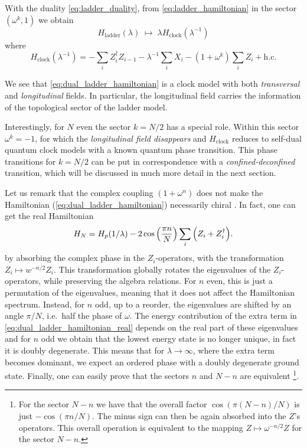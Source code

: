 With the duality \eqref{eq:ladder_duality}, from \eqref{eq:ladder_hamiltonian} in the sector $(\omega^k, 1)$ we obtain
\begin{equation}
    H_{\text{ladder}}(\lambda) \; \longmapsto \; \lambda H_{\text{clock}}(\lambda^{-1})
\end{equation}
where
\begin{equation}
    H_{\text{clock}}(\lambda^{-1}) =
    - \sum_{i} Z_i^\dagger Z_{i-1}
    - \lambda^{-1} \sum_{i} X_i
    - (1 + \omega^k) \sum_{i} Z_i
    + \text{h.c.}
    \label{eq:dual_ladder_hamiltonian}
\end{equation}

We see that \eqref{eq:dual_ladder_hamiltonian} is a clock model with both \emph{transversal} and \emph{longitudinal} fields.
In particular, the longitudinal field carries the information of the topological sector of the ladder model.

Interestingly, for $N$ even the sector $k = N/2$ has a special role.
Within this sector $\omega^k = -1$, for which the \emph{longitudinal field disappears} and $H_{\text{clock}}$ reduces to self-dual quantum clock models with a known quantum phase transition.
This phase transitions for $k = N/2$ can be put in correspondence with a \emph{confined-deconfined} transition, which will be discussed in much more detail in the next section.

Let us remark that the complex coupling $(1 + \omega^n)$ does not make the Hamiltonian  (\ref{eq:dual_ladder_hamiltonian}) necessarily chiral \cite{fendley2012parafermions, whitsitt2018clock}.
In fact, one can get the real Hamiltonian
\begin{equation}
    H_N = H_p(1/\lambda) - 2 \cos \pqty{\frac{\pi n}{N}} \sum_{i} \pqty{Z_i + Z_i^{\dagger}}.
    \label{eq:dual_ladder_hamiltonian_real}
\end{equation}
by absorbing the complex phase in the $Z_i$-operators, with the transformation $Z_i \mapsto w^{-n/2} Z_i$. This transformation globally rotates the eigenvalues of the $Z_i$-operators, while preserving the algebra relations.
For $n$ even, this is just a permutation of the eigenvalues, meaning that it does not affect the Hamiltonian spectrum. Instead, for $n$ odd, up to a reorder, the eigenvalues are shifted by an angle $\pi/N$, i.e.~half the phase of $\omega$.
The energy contribution of the extra term in \eqref{eq:dual_ladder_hamiltonian_real}  depends on the real part of these eigenvalues and for $n$ odd we obtain that the lowest energy state is no longer unique, in fact it is doubly degenerate.
This means that for $\lambda \to \infty$, where the extra term becomes dominant, we expect an ordered phase with a doubly degenerate ground state.
Finally, one can easily prove that the sectors $n$ and $N-n$ are equivalent
\footnote{For the sector $N-n$ we have that the overall factor $\cos(\pi(N-n)/N)$ is just $-\cos(\pi n/N)$.
The minus sign can then be again absorbed into the $Z$'s operators.
This overall operation is equivalent to the mapping $Z \mapsto \omega^{-n/2} Z$ for the sector $N-n$.}.

